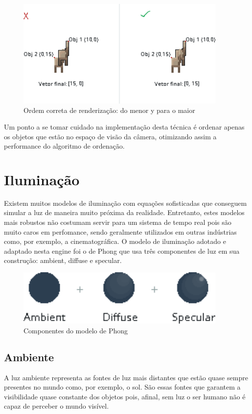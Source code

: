 \documentclass[12pt, 
openright, 
oneside, 
a4paper,    
brazil]{facom-ufu-abntex2}
\begin{document}
\begin{figure}[H]
	\centering
	\includegraphics[width=28em]{imagens/z-order.png}
	\caption{Ordem correta de renderização: do menor y para o maior}
\end{figure}

Um ponto a se tomar cuidado na implementação desta técnica é ordenar apenas os objetos que estão no espaço de visão da câmera, otimizando assim a performance do algoritmo de ordenação.


\section{Iluminação}
Existem muitos modelos de iluminação com equações sofisticadas que conseguem simular a luz de maneira muito próxima da realidade. Entretanto, estes modelos mais robustos não costumam servir para um sistema de tempo real pois são muito caros em perfomance, sendo geralmente utilizados em outras indústrias como, por exemplo, a cinematográfica.
O modelo de iluminação adotado e adaptado nesta engine foi o de Phong \cite{PhongShading} que usa três componentes de luz em sua construção: ambient, diffuse e specular.

\begin{figure}[H]
	\centering
	\includegraphics[width=28em]{imagens/lightning.png}
	\caption{Componentes do modelo de Phong}
\end{figure}


\subsection{Ambiente}
A luz ambiente representa as fontes de luz mais distantes que estão quase sempre presentes no mundo como, por exemplo, o sol. São essas fontes que garantem a visibilidade quase constante dos objetos pois, afinal, sem luz o ser humano não é capaz de perceber o mundo visível.
\end{document}
